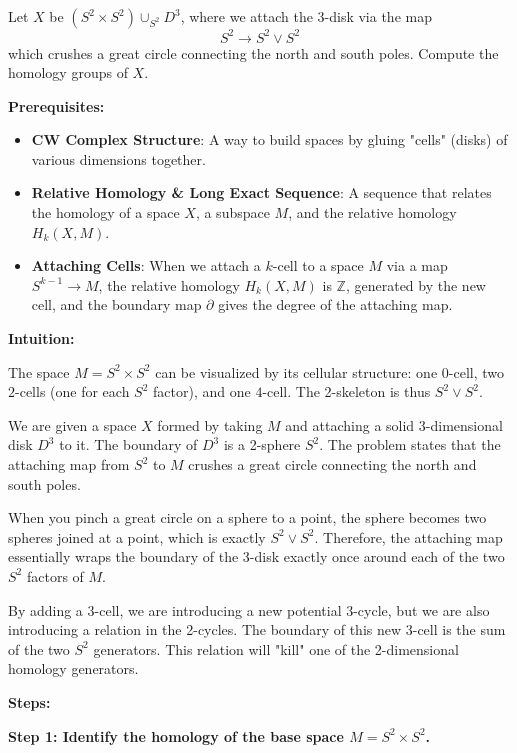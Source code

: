 \begin{exercise}
\label{geometry:2018:7}
Let $X$ be $(S^{2} \times S^{2}) \cup_{S^{2}} D^{3}$, where we attach the 3-disk via the map
\[
S^{2} \longrightarrow S^{2} \vee S^{2}
\]
which crushes a great circle connecting the north and south poles. Compute the homology groups of $X$.
\end{exercise}

\begin{solution}
\textbf{Prerequisites:}
\begin{itemize}
    \item \textbf{CW Complex Structure}: A way to build spaces by gluing "cells" (disks) of various dimensions together.
    \item \textbf{Relative Homology \& Long Exact Sequence}: A sequence that relates the homology of a space $X$, a subspace $M$, and the relative homology $H_k(X, M)$.
    \item \textbf{Attaching Cells}: When we attach a $k$-cell to a space $M$ via a map $S^{k-1} \to M$, the relative homology $H_k(X, M)$ is $\mathbb{Z}$, generated by the new cell, and the boundary map $\partial$ gives the degree of the attaching map.
\end{itemize}

\textbf{Intuition:}

The space $M = S^2 \times S^2$ can be visualized by its cellular structure: one $0$-cell, two $2$-cells (one for each $S^2$ factor), and one $4$-cell. The 2-skeleton is thus $S^2 \vee S^2$.

We are given a space $X$ formed by taking $M$ and attaching a solid 3-dimensional disk $D^3$ to it. The boundary of $D^3$ is a 2-sphere $S^2$. The problem states that the attaching map from $S^2$ to $M$ crushes a great circle connecting the north and south poles. 

When you pinch a great circle on a sphere to a point, the sphere becomes two spheres joined at a point, which is exactly $S^2 \vee S^2$. Therefore, the attaching map essentially wraps the boundary of the 3-disk exactly once around each of the two $S^2$ factors of $M$. 

By adding a 3-cell, we are introducing a new potential 3-cycle, but we are also introducing a relation in the 2-cycles. The boundary of this new 3-cell is the sum of the two $S^2$ generators. This relation will "kill" one of the 2-dimensional homology generators.

\textbf{Steps:}

\textbf{Step 1: Identify the homology of the base space $M = S^2 \times S^2$.}


\end{solution}
